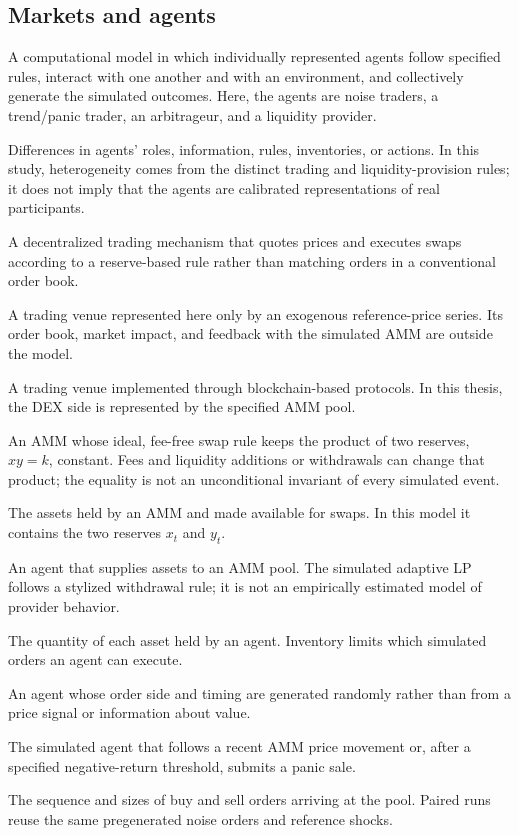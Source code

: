 \subsection*{Markets and agents}
\begin{description}[style=unboxed,leftmargin=0pt,labelwidth=0pt,labelsep=0.5em,itemsep=0.1em]
  \item[ABM --- agent-based model:] A computational model in which individually represented agents follow specified rules, interact with one another and with an environment, and collectively generate the simulated outcomes. Here, the agents are noise traders, a trend/panic trader, an arbitrageur, and a liquidity provider.
  \item[Agent heterogeneity:] Differences in agents' roles, information, rules, inventories, or actions. In this study, heterogeneity comes from the distinct trading and liquidity-provision rules; it does not imply that the agents are calibrated representations of real participants.
  \item[AMM --- automated market maker:] A decentralized trading mechanism that quotes prices and executes swaps according to a reserve-based rule rather than matching orders in a conventional order book.
  \item[CEX --- centralized exchange:] A trading venue represented here only by an exogenous reference-price series. Its order book, market impact, and feedback with the simulated AMM are outside the model.
  \item[DEX --- decentralized exchange:] A trading venue implemented through blockchain-based protocols. In this thesis, the DEX side is represented by the specified AMM pool.
  \item[CPMM --- constant-product market maker:] An AMM whose ideal, fee-free swap rule keeps the product of two reserves, $xy=k$, constant. Fees and liquidity additions or withdrawals can change that product; the equality is not an unconditional invariant of every simulated event.
  \item[Liquidity pool:] The assets held by an AMM and made available for swaps. In this model it contains the two reserves $x_t$ and $y_t$.
  \item[Liquidity provider (LP):] An agent that supplies assets to an AMM pool. The simulated adaptive LP follows a stylized withdrawal rule; it is not an empirically estimated model of provider behavior.
  \item[Inventory:] The quantity of each asset held by an agent. Inventory limits which simulated orders an agent can execute.
  \item[Noise trader:] An agent whose order side and timing are generated randomly rather than from a price signal or information about value.
  \item[Trend/panic trader:] The simulated agent that follows a recent AMM price movement or, after a specified negative-return threshold, submits a panic sale.
  \item[Order flow:] The sequence and sizes of buy and sell orders arriving at the pool. Paired runs reuse the same pregenerated noise orders and reference shocks.
\end{description}

